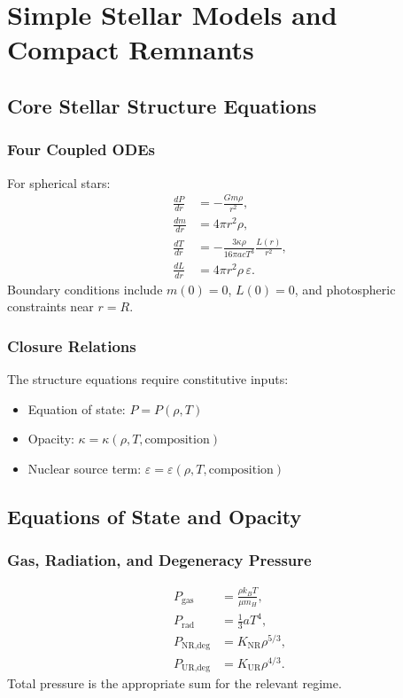 \chapter{Simple Stellar Models and Compact Remnants}

\section{Core Stellar Structure Equations}

\subsection{Four Coupled ODEs}
\begin{theory}
For spherical stars:
\begin{align}
    \frac{dP}{dr} &= -\frac{Gm\rho}{r^2}, \\
    \frac{dm}{dr} &= 4\pi r^2\rho, \\
    \frac{dT}{dr} &= -\frac{3\kappa\rho}{16\pi acT^3}\frac{L(r)}{r^2}, \\
    \frac{dL}{dr} &= 4\pi r^2\rho\,\varepsilon.
\end{align}
Boundary conditions include $m(0)=0$, $L(0)=0$, and photospheric constraints near $r=R$.
\end{theory}

\subsection{Closure Relations}
\begin{foundation}
The structure equations require constitutive inputs:
\begin{itemize}
    \item Equation of state: $P=P(\rho,T)$
    \item Opacity: $\kappa=\kappa(\rho,T,\text{composition})$
    \item Nuclear source term: $\varepsilon=\varepsilon(\rho,T,\text{composition})$
\end{itemize}
\end{foundation}

\section{Equations of State and Opacity}

\subsection{Gas, Radiation, and Degeneracy Pressure}
\begin{theory}
\begin{align}
    P_{\text{gas}} &= \frac{\rho k_B T}{\mu m_H}, \\
    P_{\text{rad}} &= \frac{1}{3}aT^4, \\
    P_{\text{NR,deg}} &= K_{\text{NR}}\rho^{5/3}, \\
    P_{\text{UR,deg}} &= K_{\text{UR}}\rho^{4/3}.
\end{align}
Total pressure is the appropriate sum for the relevant regime.
\end{theory}

